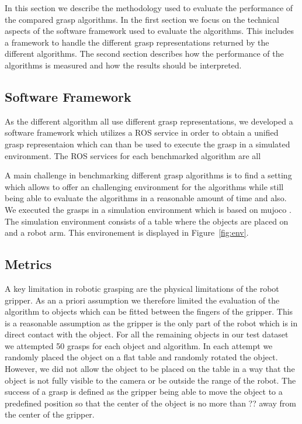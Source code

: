 In this section we describe the methodology used to evaluate the performance of the compared grasp algorithms.
In the first section we focus on the technical aspects of the software framework used to evaluate the algorithms.
This includes a framework to handle the different grasp representations returned by the different algorithms.
The second section describes how the performance of the algorithms is measured and how the results should be interpreted.

\subsection{Software Framework}
As the different algorithm all use different grasp representations, we developed a software framework which utilizes a ROS service in order to obtain
a unified grasp representaion which can than be used to execute the grasp in a simulated environment.
The ROS services for each benchmarked algorithm are all

A main challenge in benchmarking different grasp algorithms is to find a setting which allows to offer an challenging environment for the algorithms while
still being able to evaluate the algorithms in a reasonable amount of time and also.
We executed the grasps in a simulation environment which is based on mujoco \cite{}.
The simulation environment consists of a table where the objects are placed on and a robot arm.
This environement is displayed in Figure~\ref{fig:env}.



\subsection{Metrics}
A key limitation in robotic grasping are the physical limitations of the robot gripper.
As an a priori assumption we therefore limited the evaluation of the algorithm to objects which can be fitted between the fingers of the gripper.
This is a reasonable assumption as the gripper is the only part of the robot which is in direct contact with the object.
For all the remaining objects in our test dataset we attempted 50 grasps for each object and algorithm.
In each attempt we randomly placed the object on a flat table and randomly rotated the object.
However, we did not allow the object to be placed on the table in a way that the object is not fully visible to the camera or be outside the range of the robot.
The success of a grasp is defined as the gripper being able to move the object to a predefined position so that the center of the object is no more than
?? away from the center of the gripper.


